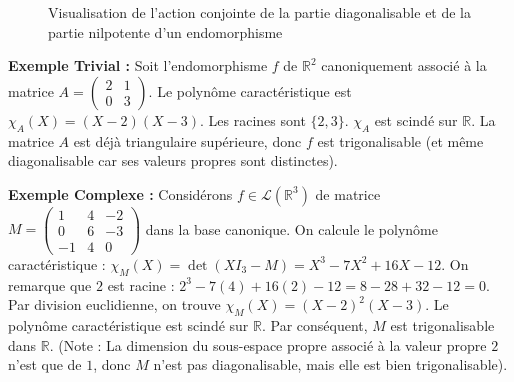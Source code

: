 \documentclass[11pt,a4paper]{article}
\begin{document}
\begin{figure}[h]
\centering
{}
\caption{Visualisation de l'action conjointe de la partie diagonalisable et de la partie nilpotente d'un endomorphisme}
\end{figure}

\textbf{Exemple Trivial :}
Soit l'endomorphisme $f$ de $\mathbb{R}^2$ canoniquement associé à la matrice $A = \begin{pmatrix} 2 & 1 \\ 0 & 3 \end{pmatrix}$.
Le polynôme caractéristique est $\chi_A(X) = (X-2)(X-3)$. Les racines sont $\{2, 3\}$. $\chi_A$ est scindé sur $\mathbb{R}$. La matrice $A$ est déjà triangulaire supérieure, donc $f$ est trigonalisable (et même diagonalisable car ses valeurs propres sont distinctes).

\textbf{Exemple Complexe :}
Considérons $f \in \mathcal{L}(\mathbb{R}^3)$ de matrice $M = \begin{pmatrix} 1 & 4 & -2 \\ 0 & 6 & -3 \\ -1 & 4 & 0 \end{pmatrix}$ dans la base canonique.
On calcule le polynôme caractéristique :
$\chi_M(X) = \det(XI_3 - M) = X^3 - 7X^2 + 16X - 12$.
On remarque que $2$ est racine : $2^3 - 7(4) + 16(2) - 12 = 8 - 28 + 32 - 12 = 0$.
Par division euclidienne, on trouve $\chi_M(X) = (X-2)^2(X-3)$.
Le polynôme caractéristique est scindé sur $\mathbb{R}$. Par conséquent, $M$ est trigonalisable dans $\mathbb{R}$. (Note : La dimension du sous-espace propre associé à la valeur propre $2$ n'est que de $1$, donc $M$ n'est pas diagonalisable, mais elle est bien trigonalisable).
\end{document}
